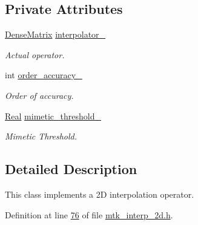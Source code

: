\subsection*{Private Attributes}
\begin{DoxyCompactItemize}
\item 
\hyperlink{classmtk_1_1DenseMatrix}{Dense\+Matrix} \hyperlink{classmtk_1_1Interp2D_aa30fa30d96c8b0a37adac36c4e344329}{interpolator\+\_\+}
\begin{DoxyCompactList}\small\item\em Actual operator. \end{DoxyCompactList}\item 
int \hyperlink{classmtk_1_1Interp2D_ad83cea724e0eff1d8b14bcba3575612e}{order\+\_\+accuracy\+\_\+}
\begin{DoxyCompactList}\small\item\em Order of accuracy. \end{DoxyCompactList}\item 
\hyperlink{group__c01-roots_gac080bbbf5cbb5502c9f00405f894857d}{Real} \hyperlink{classmtk_1_1Interp2D_a842cfa59a56be76a240dd5de68007134}{mimetic\+\_\+threshold\+\_\+}
\begin{DoxyCompactList}\small\item\em Mimetic Threshold. \end{DoxyCompactList}\end{DoxyCompactItemize}


\subsection{Detailed Description}
This class implements a 2\+D interpolation operator. 

Definition at line \hyperlink{mtk__interp__2d_8h_source_l00076}{76} of file \hyperlink{mtk__interp__2d_8h_source}{mtk\+\_\+interp\+\_\+2d.\+h}.



